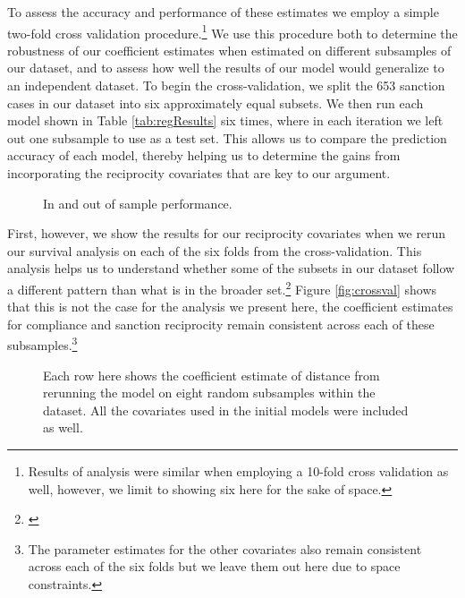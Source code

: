 To assess the accuracy and performance of these estimates we employ a simple two-fold cross validation procedure.\footnote{Results of analysis were similar when employing a 10-fold cross validation as well, however, we limit to showing six here for the sake of space.} We use this procedure both to determine the robustness of our coefficient estimates when estimated on different subsamples of our dataset, and to assess how well the results of our model would generalize to an independent dataset. To begin the cross-validation, we split the 653 sanction cases in our dataset into six approximately equal subsets. We then run each model shown in Table \ref{tab:regResults} six times, where in each iteration we left out one subsample to use as a test set. This allows us to compare the prediction accuracy of each model, thereby helping us to determine the gains from incorporating the reciprocity covariates that are key to our argument.

\begin{figure}
	\centering
	\resizebox{.8\textwidth}{!}{}
	\caption{In and out of sample performance.}
	\label{fig:rmsePlot}
\end{figure}

First, however, we show the results for our reciprocity covariates when we rerun our survival analysis on each of the six folds from the cross-validation. This analysis helps us to understand whether some of the subsets in our dataset follow a different pattern than what is in the broader set.\footnote{\cite{beck2008time}} Figure \ref{fig:crossval} shows that this is not the case for the analysis we present here, the coefficient estimates for compliance and sanction reciprocity remain consistent across each of these subsamples.\footnote{The parameter estimates for the other covariates also remain consistent across each of the six folds but we leave them out here due to space constraints.}

\begin{figure}
	\centering
	\resizebox{.8\textwidth}{!}{}
	\caption{Each row here shows the coefficient estimate of distance from rerunning the model on eight random subsamples within the dataset. All the covariates used in the initial models were included as well.}
	\label{fig:crossPlot}
\end{figure}